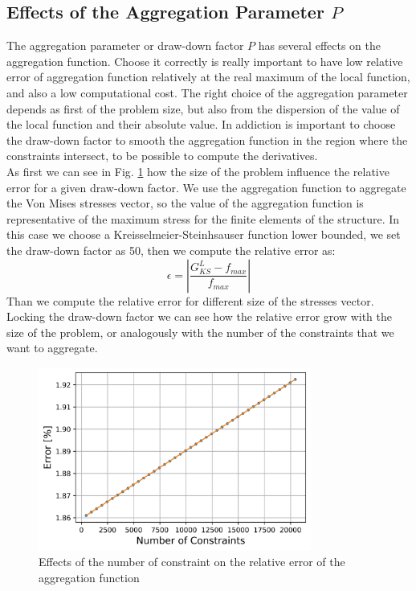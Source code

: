 \subsection{Effects of the Aggregation Parameter $P$}
The aggregation parameter or draw-down factor $P$ has several effects on the aggregation function. Choose it correctly is really important to have low relative error of aggregation function relatively at the real maximum of the local function, and also a low computational cost. The right choice of the aggregation parameter depends as first of the problem size, but also from the dispersion of the value of the local function and their absolute value. In addiction is important to choose the draw-down factor to smooth the aggregation function in the region where the constraints intersect, to be possible to compute the derivatives.\\
As first we can see in Fig. \ref{fig:3_3} how the size of the problem influence the relative error for a given draw-down factor. We use the aggregation function to aggregate the Von Mises stresses vector, so the value of the aggregation function is representative of the maximum stress for the finite elements of the structure. In this case we choose a Kreisselmeier-Steinhsauser function lower bounded, we set the draw-down factor as 50, then we compute the relative error as:
\begin{equation*}
\epsilon = \left| \frac{G_{KS}^L-f_{max}}{f_{max}} \right|
\end{equation*}
Than we compute the relative error for different size of the stresses vector. Locking the draw-down factor we can see how the relative error grow with the size of the problem, or analogously with the number of the constraints that we want to aggregate.
\begin{figure}[H]
	\centering
	\includegraphics[width = 0.8\textwidth]{./Immagini/3_3.png}
	\caption{Effects of the number of constraint on the relative error of the aggregation function}
	\label{fig:3_3}
\end{figure}
